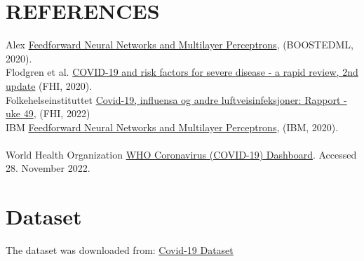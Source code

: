 \documentclass[english,notitlepage,reprint,nofootinbib]{revtex4-1}  %
\begin{document}
\section{REFERENCES}\label{sec: REF}
Alex 
\href{https://boostedml.com/2020/04/feedforward-neural-networks-and-multilayer-perceptrons.html}{Feedforward Neural Networks and Multilayer Perceptrons}, (BOOSTEDML, 2020).\label{ref:MLP kilde}
\\
Flodgren et al. \href{https://www.fhi.no/globalassets/dokumenterfiler/rapporter/2020/covid-19-and-risk-factors-for-severe-disease-2nd-update-report-2020.pdf}{COVID-19 and risk factors for severe disease - a rapid review, 2nd update} (FHI, 2020). \label{ref: FHI risikofaktorer}
\\
Folkehelseinstituttet \href{https://www.fhi.no/contentassets/8a971e7b0a3c4a06bdbf381ab52e6157/vedlegg/2022/ukerapport-uke-49-05.12--11.12.22.pdf}{Covid-19, influensa og andre luftveisinfeksjoner: Rapport - uke 49}, (FHI, 2022) \label{ref: ukerapport_corona}
\\
IBM 
\href{https://www.ibm.com/cloud/learn/random-forest}{Feedforward Neural Networks and Multilayer Perceptrons}, (IBM, 2020).\label{ref:RandomForest Kilde}
\\

\\
World Health Organization \href{https://covid19.who.int/}{WHO Coronavirus (COVID-19) Dashboard}. Accessed 28. November 2022. \label{ref: numberOfDeaths}





\appendix
\section{Dataset} \label{sec: Dataset}
The dataset was downloaded from: \href{https://www.kaggle.com/datasets/meirnizri/covid19-dataset}{Covid-19 Dataset}
\end{document}
